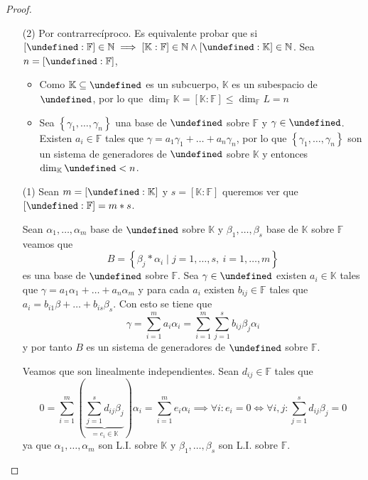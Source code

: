 \documentclass[10pt, spanish]{report}
\theoremstyle{definition}
\theoremstyle{custom}
\theoremstyle{remark}
\newcommand{\N}{\mathbb{N}}
\newcommand{\F}{\mathbb{F}}
\newcommand{\K}{\mathbb{K}}
\let\L\undefined
\newcommand{\L}{\mathbb{L}}
\renewcommand{\leq}{\leqslant}
\begin{document}
\begin{proof}\hspace{0pt}
    \begin{enumerate}
        \item[(2)] Por contrarrecíproco. Es equivalente probar que si
            $[\L:\F]\in \N\implies[\K:\F]\in \N \wedge[\L:\K]\in \N$. Sea
            $n=[\L:\F]$,
            \begin{itemize}
                \item Como $\K\subseteq\L$ es un subcuerpo, $\K$ es un
                    subespacio de $\L$, por lo que $\dim_\F{\K}=[\K:\F]\leq
                    \dim_\F{L}=n$
                \item Sea $\left\{ \gamma_1,\ldots,\gamma_n \right\}$ una base
                    de $\L$ sobre $\F$ y $\gamma\in \L$. Existen $a_i\in\F$ tales
                    que $\gamma=a_1\gamma_1+\ldots+a_n\gamma_n$, por lo que
                    $\left\{ \gamma_1,\ldots,\gamma_n \right\} $ son un sistema
                    de generadores de $\L$ sobre $\K$ y entonces
                    $\dim_\K{\L}<n$.
            \end{itemize}
        \item[(1)] Sean $m=[\L:\K]$ y $s=[\K:\F]$ queremos ver que
            $[\L:\F]=m*s$.

            Sean $\alpha_1,\ldots,\alpha_m$ base de $\L$ sobre
            $\K$ y $\beta_1,\ldots,\beta_s$ base de $\K$ sobre $\F$ veamos que
            \[B=\left\{\beta_j*\alpha_i\mid j=1,\ldots,s,\ i=1,\ldots,m\right\}\]
            es una base de $\L$ sobre $\F$. Sea $\gamma\in\L$ existen $a_i\in\K$
            tales que $\gamma=a_1\alpha_1+\ldots+a_n\alpha_m$ y para cada $a_i$
            existen $b_{ij}\in\F$ tales que $a_i=b_{i1}\beta+\ldots+b_{is}
            \beta_s$. Con esto se tiene que \[\gamma=\sum_{i=1}^{m}a_i\alpha_i=
            \sum_{i=1}^m\sum_{j=1}^sb_{ij}\beta_j\alpha_i\] y por tanto $B$ es
            un sistema de generadores de $\L$ sobre $\F$.

            Veamos que son linealmente independientes. Sean $d_{ij}\in\F$ tales
            que
            \[0=\sum_{i=1}^m(\underbrace{\sum_{j=1}^sd_{ij}\beta_j}_{=e_i\in\K})
            \alpha_i=\sum_{i=1}^me_i\alpha_i\implies\forall i: e_i=0\Leftrightarrow
        \forall i,j:\sum_{j=1}^sd_{ij} \beta_j=0\]
            ya que $\alpha_1,\ldots,\alpha_m$ son L.I. sobre $\K$ y
            $\beta_1,\ldots,\beta_s$ son L.I. sobre $\F$.
    \end{enumerate}
    \vspace{-1.75em}
\end{proof}
\end{document}
